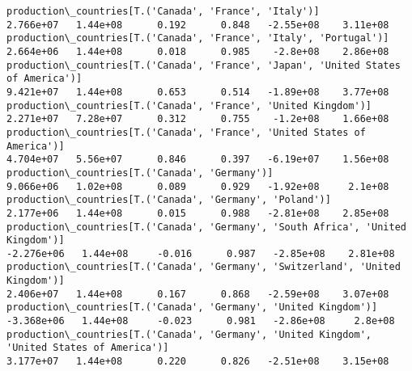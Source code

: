 \documentclass[11pt]{article}
\begin{document}
\begin{Verbatim}[commandchars=\\\{\}]
production\_countries[T.('Canada', 'France', 'Italy')]                                                                                                                                  2.766e+07   1.44e+08      0.192      0.848   -2.55e+08    3.11e+08
production\_countries[T.('Canada', 'France', 'Italy', 'Portugal')]                                                                                                                      2.664e+06   1.44e+08      0.018      0.985    -2.8e+08    2.86e+08
production\_countries[T.('Canada', 'France', 'Japan', 'United States of America')]                                                                                                      9.421e+07   1.44e+08      0.653      0.514   -1.89e+08    3.77e+08
production\_countries[T.('Canada', 'France', 'United Kingdom')]                                                                                                                         2.271e+07   7.28e+07      0.312      0.755    -1.2e+08    1.66e+08
production\_countries[T.('Canada', 'France', 'United States of America')]                                                                                                               4.704e+07   5.56e+07      0.846      0.397   -6.19e+07    1.56e+08
production\_countries[T.('Canada', 'Germany')]                                                                                                                                          9.066e+06   1.02e+08      0.089      0.929   -1.92e+08     2.1e+08
production\_countries[T.('Canada', 'Germany', 'Poland')]                                                                                                                                2.177e+06   1.44e+08      0.015      0.988   -2.81e+08    2.85e+08
production\_countries[T.('Canada', 'Germany', 'South Africa', 'United Kingdom')]                                                                                                       -2.276e+06   1.44e+08     -0.016      0.987   -2.85e+08    2.81e+08
production\_countries[T.('Canada', 'Germany', 'Switzerland', 'United Kingdom')]                                                                                                         2.406e+07   1.44e+08      0.167      0.868   -2.59e+08    3.07e+08
production\_countries[T.('Canada', 'Germany', 'United Kingdom')]                                                                                                                       -3.368e+06   1.44e+08     -0.023      0.981   -2.86e+08     2.8e+08
production\_countries[T.('Canada', 'Germany', 'United Kingdom', 'United States of America')]                                                                                            3.177e+07   1.44e+08      0.220      0.826   -2.51e+08    3.15e+08

\end{Verbatim}
\end{document}
